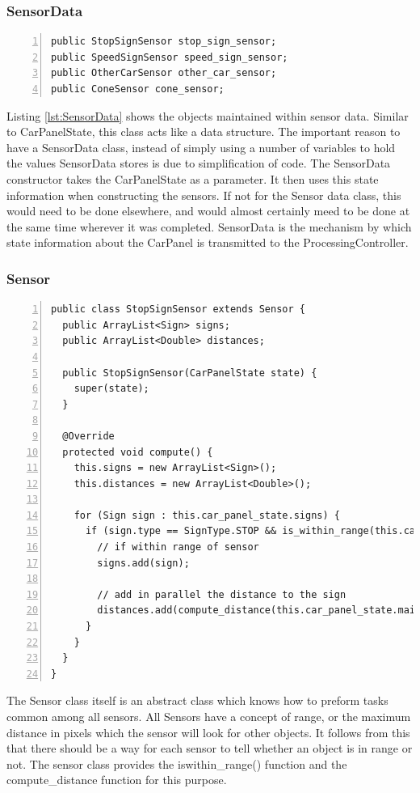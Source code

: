 \documentclass{article} %
\begin{document}
\subsubsection{SensorData}
\begin{lstlisting}[caption={Sensor Data maintains a number of sensors},label={lst:SensorData},numbers=left]
public StopSignSensor stop_sign_sensor;
public SpeedSignSensor speed_sign_sensor;
public OtherCarSensor other_car_sensor;
public ConeSensor cone_sensor;
\end{lstlisting}

Listing \ref{lst:SensorData} shows the objects maintained within sensor data.
Similar to CarPanelState, this class acts like a data structure.
The important reason to have a SensorData class, instead of simply using a number of variables to hold the values SensorData stores is due to simplification of code.
The SensorData constructor takes the CarPanelState as a parameter.
It then uses this state information when constructing the sensors.
If not for the Sensor data class, this would need to be done elsewhere, and would almost certainly meed to be done at the same time wherever it was completed.
SensorData is the mechanism by which state information about the CarPanel is transmitted to the ProcessingController.

\subsubsection{Sensor}
\begin{lstlisting}[float=*,caption={Implementation of Sensor},label={lst:sensor},numbers=left]
public class StopSignSensor extends Sensor {
  public ArrayList<Sign> signs;
  public ArrayList<Double> distances;

  public StopSignSensor(CarPanelState state) {
    super(state);
  }

  @Override
  protected void compute() {
    this.signs = new ArrayList<Sign>();
    this.distances = new ArrayList<Double>();

    for (Sign sign : this.car_panel_state.signs) {
      if (sign.type == SignType.STOP && is_within_range(this.car_panel_state.main_car, sign)) {
        // if within range of sensor
        signs.add(sign);

        // add in parallel the distance to the sign
        distances.add(compute_distance(this.car_panel_state.main_car, sign));
      }
    }
  }
}
\end{lstlisting}

The Sensor class itself is an abstract class which knows how to preform tasks common among all sensors.
All Sensors have a concept of range, or the maximum distance in pixels which the sensor will look for other objects.
It follows from this that there should be a way for each sensor to tell whether an object is in range or not.
The sensor class provides the is\-within\_range() function and the compute\_distance function for this purpose.
\end{document}
